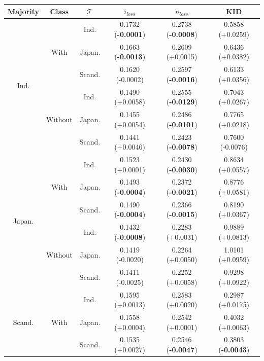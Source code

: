 \begin{table}[H]
\centering
\begin{tabular}{c|c|c|c|c|c}
    \textbf{Majority} & \textbf{Class} & \textbf{$\mathcal{T}$} & \textbf{$i_{loss}$} & \textbf{$n_{loss}$} & \textbf{KID} \\
    \toprule

\multirow{6}{*}{Ind.} & \multirow{3}{*}{With} & Ind.     & 0.1732 (\textbf{-0.0001})       & 0.2738 (\textbf{-0.0008})       & 0.5858 (+0.0259)    \\
 &  & Japan.   & 0.1663 (\textbf{-0.0013})       & 0.2609 (+0.0015)       & 0.6436 (+0.0382)  \\
 &  & Scand. & 0.1620 (-0.0002)       & 0.2597 (\textbf{-0.0016})       & 0.6133 (+0.0356)  \\
\hhline{~-----}
 & \multirow{3}{*}{Without} & Ind.     & 0.1490 (+0.0058)       & 0.2555 (\textbf{-0.0129})       & 0.7043 (+0.0267)   \\
 &  & Japan.   & 0.1455 (+0.0054)       & 0.2486 (\textbf{-0.0101})       & 0.7765 (+0.0218)  \\
 &  & Scand. & 0.1441 (+0.0046)       & 0.2423 (\textbf{-0.0078})       & 0.7600 (-0.0076)  \\
\midrule
\multirow{6}{*}{Japan.} & \multirow{3}{*}{With} & Ind.     & 0.1523 (+0.0001)       & 0.2430 (\textbf{-0.0030})       & 0.8634 (+0.0557)   \\
 &  & Japan.   & 0.1493 (\textbf{-0.0004})       & 0.2372 (\textbf{-0.0021})       & 0.8776 (+0.0581)   \\
 &  & Scand. & 0.1490 (\textbf{-0.0004})       & 0.2366 (\textbf{-0.0015})       & 0.8190 (+0.0367)  \\
\hhline{~-----}
 & \multirow{3}{*}{Without} & Ind.     & 0.1432 (\textbf{-0.0008})       & 0.2283 (+0.0031)       & 0.9889 (+0.0813)     \\
 &  & Japan.   & 0.1419 (-0.0020)       & 0.2264 (+0.0050)       & 1.0101 (+0.0959)  \\
 &  & Scand. & 0.1411 (-0.0025)       & 0.2252 (+0.0058)       & 0.9298 (+0.0922)  \\
\midrule
\multirow{6}{*}{Scand.} & \multirow{3}{*}{With} & Ind.     & 0.1595 (+0.0013)       & 0.2583 (+0.0020)       & 0.2987 (+0.0175)   \\
 &  & Japan.   & 0.1558 (+0.0004)       & 0.2542 (+0.0001)       & 0.4032 (+0.0063)   \\
 &  & Scand. & 0.1535 (+0.0027)       & 0.2546 (\textbf{-0.0047})       & 0.3803 (\textbf{-0.0043}) \\

\end{tabular}
\end{table}
